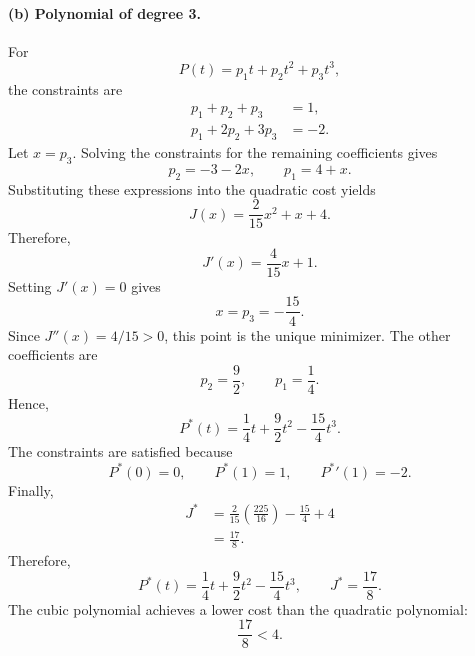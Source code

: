 \documentclass[11pt]{article}
\begin{document}
\paragraph{(b) Polynomial of degree 3.}
For
\begin{equation}
    P(t)=p_1t+p_2t^2+p_3t^3,
\end{equation}
the constraints are
\begin{align}
    p_1+p_2+p_3&=1, \\
    p_1+2p_2+3p_3&=-2.
\end{align}
Let $x=p_3$. Solving the constraints for the remaining coefficients gives
\begin{equation}
    p_2=-3-2x,
    \qquad
    p_1=4+x.
\end{equation}
Substituting these expressions into the quadratic cost yields
\begin{equation}
    J(x)=\frac{2}{15}x^2+x+4.
\end{equation}
Therefore,
\begin{equation}
    J'(x)=\frac{4}{15}x+1.
\end{equation}
Setting $J'(x)=0$ gives
\begin{equation}
    x=p_3=-\frac{15}{4}.
\end{equation}
Since $J''(x)=4/15>0$, this point is the unique minimizer. The other
coefficients are
\begin{equation}
    p_2=\frac{9}{2},
    \qquad
    p_1=\frac{1}{4}.
\end{equation}
Hence,
\begin{equation}
    P^*(t)
    =\frac{1}{4}t
     +\frac{9}{2}t^2
     -\frac{15}{4}t^3.
\end{equation}
The constraints are satisfied because
\begin{equation}
    P^*(0)=0,
    \qquad
    P^*(1)=1,
    \qquad
    {P^*}'(1)=-2.
\end{equation}
Finally,
\begin{align}
    J^*
    &=\frac{2}{15}\left(\frac{225}{16}\right)
      -\frac{15}{4}+4 \\
    &=\frac{17}{8}.
\end{align}
Therefore,
\begin{equation}
    \boxed{
    P^*(t)=\frac{1}{4}t+\frac{9}{2}t^2-\frac{15}{4}t^3,
    \qquad
    J^*=\frac{17}{8}.}
\end{equation}
The cubic polynomial achieves a lower cost than the quadratic polynomial:
\begin{equation}
    \frac{17}{8}<4.
\end{equation}
\end{document}
